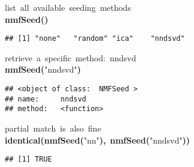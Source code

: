 \documentclass[a4paper]{article}\usepackage{graphicx, color}
\makeatletter
\newcommand{\hlfunctioncall}[1]{\textcolor[rgb]{0.501960784313725,0,0.329411764705882}{\textbf{#1}}}%
\newcommand{\hlstring}[1]{\textcolor[rgb]{0.6,0.6,1}{#1}}%
\newcommand{\hlkeyword}[1]{\textcolor[rgb]{0,0,0}{\textbf{#1}}}%
\newcommand{\hlcomment}[1]{\textcolor[rgb]{0.180392156862745,0.6,0.341176470588235}{#1}}%
\newcommand{\hlstd}[1]{\textcolor[rgb]{0,0,0}{#1}}%
\newenvironment{kframe}{%
 \def\FrameCommand##1{\hskip\@totalleftmargin \hskip-\fboxsep
 \colorbox{shadecolor}{##1}\hskip-\fboxsep
     \hskip-\linewidth \hskip-\@totalleftmargin \hskip\columnwidth}%
 \MakeFramed {\advance\hsize-\width
   \@totalleftmargin\z@ \linewidth\hsize
   \@setminipage}}%
 {\par\unskip\endMakeFramed}
\newenvironment{knitrout}{}{} %
\makeatother
\begin{document}
\begin{knitrout}
\color{fgcolor}\begin{kframe}
\begin{flushleft}
\ttfamily\noindent
\hlcomment{\usebox{\hlnormalsizeboxhash}{\ }list{\ }all{\ }available{\ }seeding{\ }methods}\hspace*{\fill}\\
\hlstd{}\hlfunctioncall{nmfSeed}\hlkeyword{(}\hlkeyword{)}\mbox{}
\normalfont
\end{flushleft}
\begin{verbatim}
## [1] "none"   "random" "ica"    "nndsvd"
\end{verbatim}
\begin{flushleft}
\ttfamily\noindent
\hlcomment{\usebox{\hlnormalsizeboxhash}{\ }retrieve{\ }a{\ }specific{\ }method:{\ }\usebox{\hlnormalsizeboxsinglequote}nndsvd\usebox{\hlnormalsizeboxsinglequote}}\hspace*{\fill}\\
\hlstd{}\hlfunctioncall{nmfSeed}\hlkeyword{(}\hlstring{"{}nndsvd"{}}\hlkeyword{)}\mbox{}
\normalfont
\end{flushleft}
\begin{verbatim}
## <object of class:  NMFSeed >
## name:	 nndsvd 
## method:	 <function> 
\end{verbatim}
\begin{flushleft}
\ttfamily\noindent
\hlcomment{\usebox{\hlnormalsizeboxhash}{\ }partial{\ }match{\ }is{\ }also{\ }fine}\hspace*{\fill}\\
\hlstd{}\hlfunctioncall{identical}\hlkeyword{(}\hlfunctioncall{nmfSeed}\hlkeyword{(}\hlstring{"{}nn"{}}\hlkeyword{)}\hlkeyword{,}{\ }\hlfunctioncall{nmfSeed}\hlkeyword{(}\hlstring{"{}nndsvd"{}}\hlkeyword{)}\hlkeyword{)}\mbox{}
\normalfont
\end{flushleft}
\begin{verbatim}
## [1] TRUE
\end{verbatim}
\end{kframe}
\end{knitrout}
\end{document}
